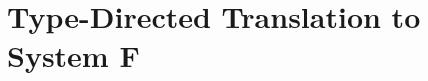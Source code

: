 \section{Type-Directed Translation to System F}
\label{sec:trans}

\begin{comment}

\figtwocol{f:trans}{Type-directed Translation to System F}{
\small
\bda{llrl} 
\text{Type Environments} & \tenv & ::= & \epsilon \mid \tenv,
\relation{x}{\rulet} \\
\text{Singleton Environments} & \Theta & ::= & \rulet \leadsto E\\
\text{Translation Environments} & \env & ::= & \epsilon \mid \env, \rulet \leadsto x \\
\eda \\
\bda{lc} 

& \multicolumn{1}{c}{
  \myruleform{\tenv \mid \denv \turns \relation{e}{\rulet} \leadsto E}} \\
\\
\TrInt &
{ \tenv \mid \denv \turns \relation{n}{\tyint} \leadsto n } 
\\ \\

\TrVar &
\myirule
{ (\relation{x}{\rulet}) \in \tenv}
{ \tenv \mid \denv \turns \relation{x}{\rulet} \leadsto x
} 
\\ \\

\TrAbs &
\myirule
{ \tenv;\relation{x}{\rulet_1}\mid \denv \turns \relation{e}{\rulet_2} \leadsto E
}
{ \tenv\mid\denv \turns \relation{\lambda \relation{x}{\rulet_1}.e}{\rulet_1 \arrow \rulet_2}
  \leadsto \lambda \relation{x}{|\rulet_1|}.E } 
\\ \\

\TrApp &
\myirule
{ \tenv\mid \denv \turns \relation{e_1}{\rulet_1 \arrow \rulet_2} \leadsto E_1 \\
  \tenv\mid \denv \turns \relation{e_2}{\rulet_1} \leadsto E_2
}
{ \tenv\mid\denv \turns \relation{e_1\,e_2}{\rulet_2} \leadsto E_1\,E_2} 
\\ \\


\end{comment}
